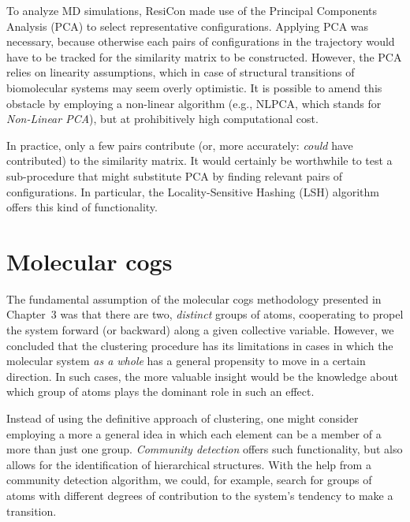 \documentclass[a4paper,11pt,twoside]{book}%
\begin{document}
To analyze MD simulations, ResiCon made use of the Principal Components Analysis (PCA) to select representative configurations. %
Applying PCA was necessary, because otherwise each pairs of configurations in the trajectory would have to be tracked for the similarity matrix to be constructed.
However, the PCA relies on linearity assumptions, which in case of structural transitions of biomolecular systems may seem overly optimistic.
It is possible to amend this obstacle by employing a non-linear algorithm (e.g., NLPCA, which stands for \emph{Non-Linear PCA}), but at prohibitively high computational cost.

In practice, only a few pairs contribute (or, more accurately: \emph{could} have contributed) to the similarity matrix.
It would certainly be worthwhile to test a sub-procedure that might substitute PCA by finding relevant pairs of configurations.
In particular, the Locality-Sensitive Hashing (LSH) algorithm offers this kind of functionality.

\section{Molecular cogs}

The fundamental assumption of the molecular cogs methodology presented in Chapter~3 was that there are two, \emph{distinct} groups of atoms, cooperating to propel the system forward (or backward) along a given collective variable.
However, we concluded that the clustering procedure has its limitations in cases in which the molecular system \emph{as a whole} has a general propensity to move in a certain direction.
In such cases, the more valuable insight would be the knowledge about which group of atoms plays the dominant role in such an effect.

Instead of using the definitive approach of clustering, one might consider employing a more a general idea in which each element can be a member of a more than just one group.
\emph{Community detection} offers such functionality, but also allows for the identification of hierarchical structures.
With the help from a community detection algorithm, we could, for example, search for groups of atoms with different degrees of contribution to the system's tendency to make a transition.
\end{document}
